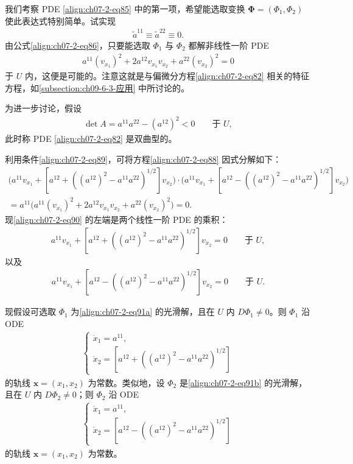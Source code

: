 \documentclass[../../main.tex]{subfiles}
\begin{document}
我们考察 PDE \eqref{align:ch07-2-eq85} 中的第一项，希望能选取变换 $\boldsymbol{\Phi}=(\Phi_1,\Phi_2)$ 使此表达式特别简单。试实现
\begin{align}
\widetilde{a}^{11}\equiv\widetilde{a}^{22}\equiv 0.\label{align:ch07-2-eq87}
\end{align}
由公式\eqref{align:ch07-2-eq86}，只要能选取 $\Phi_1$ 与 $\Phi_2$ 都解非线性一阶 PDE
\begin{align}
a^{11}(v_{x_1})^2+2a^{12}v_{x_1}v_{x_2}+a^{22}(v_{x_2})^2=0\label{align:ch07-2-eq88}
\end{align}
于 $U$ 内，这便是可能的。注意这就是与偏微分方程\eqref{align:ch07-2-eq82} 相关的特征方程，如\cref{subsection:ch09-6-3-应用} 中所讨论的。

为进一步讨论，假设
\begin{align}
\det A = a^{11}a^{22}-(a^{12})^2<0\qquad \text{于 } U,\label{align:ch07-2-eq89}
\end{align}
此时称 PDE \eqref{align:ch07-2-eq82} 是双曲型的。

利用条件\eqref{align:ch07-2-eq89}，可将方程\eqref{align:ch07-2-eq88} 因式分解如下：
{\small\begin{align}
\bigl(a^{11}v_{x_1}+[a^{12}+((a^{12})^2-a^{11}a^{22})^{1/2}]v_{x_2}\bigr)
\cdot\bigl(a^{11}v_{x_1}+[a^{12}-((a^{12})^2-a^{11}a^{22})^{1/2}]v_{x_2}\bigr)\nonumber\\
= a^{11}\bigl(a^{11}(v_{x_1})^2+2a^{12}v_{x_1}v_{x_2}+a^{22}(v_{x_2})^2\bigr)=0.\label{align:ch07-2-eq90}
\end{align}}
现\eqref{align:ch07-2-eq90} 的左端是两个线性一阶 PDE 的乘积：
\begin{align}
a^{11}v_{x_1}+[a^{12}+((a^{12})^2-a^{11}a^{22})^{1/2}]v_{x_2}=0\qquad \text{于 } U,\label{align:ch07-2-eq91a}
\end{align}
以及
\begin{align}
a^{11}v_{x_1}+[a^{12}-((a^{12})^2-a^{11}a^{22})^{1/2}]v_{x_2}=0\qquad \text{于 } U.\label{align:ch07-2-eq91b}
\end{align}

现假设可选取 $\Phi_1$ 为\eqref{align:ch07-2-eq91a} 的光滑解，且在 $U$ 内 $D\Phi_1\neq 0$。则 $\Phi_1$ 沿 ODE
\begin{align}
\begin{cases}
\dot{x}_1=a^{11},\\
\dot{x}_2=[a^{12}+((a^{12})^2-a^{11}a^{22})^{1/2}]
\end{cases}\label{align:ch07-2-eq92}
\end{align}
的轨线 $\mathbf{x}=(x_1,x_2)$ 为常数。类似地，设 $\Phi_2$ 是\eqref{align:ch07-2-eq91b} 的光滑解，且在 $U$ 内 $D\Phi_2\neq 0$；则 $\Phi_2$ 沿 ODE
\begin{align}
\begin{cases}
\dot{x}_1=a^{11},\\
\dot{x}_2=[a^{12}-((a^{12})^2-a^{11}a^{22})^{1/2}]
\end{cases}\label{align:ch07-2-eq93}
\end{align}
的轨线 $\mathbf{x}=(x_1,x_2)$ 为常数。
\end{document}
